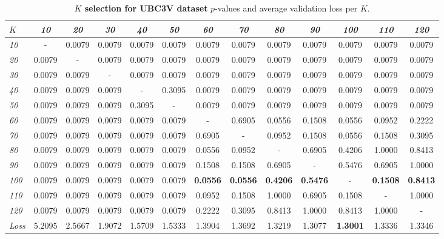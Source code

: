 \documentclass[review,12pt,3p]{elsarticle}
\begin{document}
\begin{table}[t]
\caption{\textbf{$K$ selection for UBC3V dataset} $p$-values and average validation loss per $K$.}
\label{tab:statsKUBC3V}
\scriptsize%
\begin{center}
\setlength{\tabcolsep}{0.2em} %
\begin{tabular}{|l|c c c c c c c c c c c c|}
\hline
 $K$ & \emph{10} & \emph{20}& \emph{30}& \emph{40}& \emph{50}& \emph{60}& \emph{70}& \emph{80}& \emph{90}& \emph{100}& \emph{110}& \emph{120} \\
 \hline \emph{10} & - & 0.0079 & 0.0079 & 0.0079 & 0.0079 & 0.0079 & 0.0079 & 0.0079 & 0.0079 & 0.0079 & 0.0079 & 0.0079  \\
   \emph{20} & 0.0079 & - & 0.0079 & 0.0079 & 0.0079 & 0.0079 & 0.0079 & 0.0079 & 0.0079 & 0.0079 & 0.0079 & 0.0079  \\
   \emph{30} & 0.0079 & 0.0079 & - & 0.0079 & 0.0079 & 0.0079 & 0.0079 & 0.0079 & 0.0079 & 0.0079 & 0.0079 & 0.0079  \\
   \emph{40} & 0.0079 & 0.0079 & 0.0079 & - & 0.3095 & 0.0079 & 0.0079 & 0.0079 & 0.0079 & 0.0079 & 0.0079 & 0.0079  \\
   \emph{50} & 0.0079 & 0.0079 & 0.0079 & 0.3095 & - & 0.0079 & 0.0079 & 0.0079 & 0.0079 & 0.0079 & 0.0079 & 0.0079  \\
   \emph{60} & 0.0079 & 0.0079 & 0.0079 & 0.0079 & 0.0079 & - & 0.6905 & 0.0556 & 0.1508 & 0.0556 & 0.0952 & 0.2222  \\
   \emph{70} & 0.0079 & 0.0079 & 0.0079 & 0.0079 & 0.0079 & 0.6905 & - & 0.0952 & 0.1508 & 0.0556 & 0.1508 & 0.3095  \\
   \emph{80} & 0.0079 & 0.0079 & 0.0079 & 0.0079 & 0.0079 & 0.0556 & 0.0952 & - & 0.6905 & 0.4206 & 1.0000 & 0.8413  \\
   \emph{90} & 0.0079 & 0.0079 & 0.0079 & 0.0079 & 0.0079 & 0.1508 & 0.1508 & 0.6905 & - & 0.5476 & 0.6905 & 1.0000  \\
   \emph{100} & 0.0079 & 0.0079 & 0.0079 & 0.0079 & 0.0079 & \textbf{0.0556} & \textbf{0.0556} & \textbf{0.4206} & \textbf{0.5476} & - & \textbf{0.1508} & \textbf{0.8413}  \\
   \emph{110} & 0.0079 & 0.0079 & 0.0079 & 0.0079 & 0.0079 & 0.0952 & 0.1508 & 1.0000 & 0.6905 & 0.1508 & - & 1.0000  \\
   \emph{120} & 0.0079 & 0.0079 & 0.0079 & 0.0079 & 0.0079 & 0.2222 & 0.3095 & 0.8413 & 1.0000 & 0.8413 & 1.0000 & -  \\
\hline 
\hline
\textit{Loss} & 5.2095   & 2.5667    &1.9072   & 1.5709    &1.5333    &1.3904    &1.3692   & 1.3219    &1.3077    &\textbf{1.3001}    &1.3336    &1.3346\\
\hline
\end{tabular} 
\end{center}
\end{table}
\end{document}
